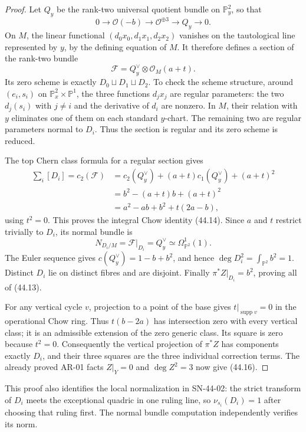 \begin{proof}
Let $Q_y$ be the rank-two universal quotient bundle on
$\mathbb P^2_y$, so that
\[
 0\longrightarrow\mathcal O(-b)\longrightarrow
 \mathcal O^{\oplus3}\longrightarrow Q_y\longrightarrow0.
\]
On $M$, the linear functional
$(d_0x_0,d_1x_1,d_2x_2)$ vanishes on the tautological line represented
by $y$, by the defining equation of $M$.  It therefore defines a
section of the rank-two bundle
\[
 \mathcal F=Q_y^\vee\otimes\mathcal O_M(a+t).
\]
Its zero scheme is exactly $D_0\sqcup D_1\sqcup D_2$.
To check the scheme structure, around $(e_i,s_i)$ on
$\mathbb P^2_x\times\mathbb P^1$, the three functions $d_jx_j$
are regular parameters: the two $d_j(s_i)$ with $j\ne i$ and
the derivative of $d_i$ are nonzero.  In $M$, their relation with
$y$ eliminates one of them on each standard $y$-chart.  The
remaining two are regular parameters normal to $D_i$.
Thus the section is regular and its zero scheme is reduced.

The top Chern class formula for a regular section gives
\[
 \begin{split}
 \sum_i[D_i]=c_2(\mathcal F)
 &=c_2(Q_y^\vee)+(a+t)c_1(Q_y^\vee)+(a+t)^2\\
 &=b^2-(a+t)b+(a+t)^2\\
 &=a^2-ab+b^2+t(2a-b),
 \end{split}
\]
using $t^2=0$.  This proves the integral Chow identity (44.14).
Since $a$ and $t$ restrict trivially to $D_i$, its normal bundle is
\[
 N_{D_i/M}=\mathcal F|_{D_i}=Q_y^\vee
             \simeq\Omega^1_{\mathbb P^2}(1).
\]
The Euler sequence gives $c(Q_y^\vee)=1-b+b^2$, and hence
$\deg D_i^2=\int_{\mathbb P^2}b^2=1$.  Distinct $D_i$ lie on
distinct fibres and are disjoint.  Finally
$\pi^*Z|_{D_i}=b^2$, proving all of (44.13).

For any vertical cycle $v$, projection to a point of the base gives
$t|_{\operatorname{supp}v}=0$ in the operational Chow ring.  Thus
$t(b-2a)$ has intersection zero with every vertical class; it is an
admissible extension of the zero generic class.  Its square is zero
because $t^2=0$.  Consequently the vertical projection of $\pi^*Z$
has components exactly $D_i$, and their three squares are the three
individual correction terms.  The already proved AR-01 facts
$Z|_Y=0$ and $\deg Z^2=3$ now give (44.16).
\end{proof}

This proof also identifies the local normalization in SN-44-02:
the strict transform of $D_i$ meets the exceptional quadric in one
ruling line, so $\nu_{s_i}(D_i)=1$ after choosing that ruling first.
The normal bundle computation independently verifies its norm.

